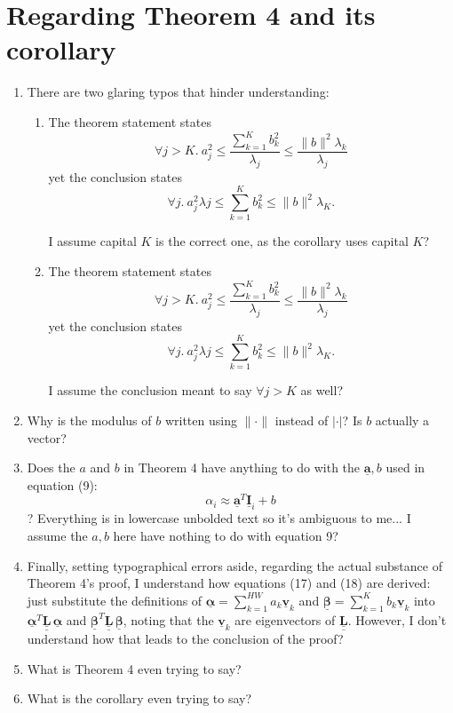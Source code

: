 \documentclass{article}
\def\vec#1{\underline{\mathbf{#1}}}
\def\vecbs#1{\underline{\boldsymbol{#1}}}
\def\mat#1{\underline{\underline{\mathbf{#1}}}}
\begin{document}
\section{Regarding Theorem 4 and its corollary}
\begin{enumerate}
    \item There are two glaring typos that hinder understanding:
    \begin{enumerate}
        \item The theorem statement states
        $$\forall j>K.\ a_j^2 \leq \frac{\sum_{k=1}^K b_k^2}{\lambda_j} \leq \frac{\|b\|^2 \lambda_{\boxed{k}}}{\lambda_j}$$
        yet the conclusion states
        $$\forall j.\ a_j^2\lambda j \leq \sum_{k=1}^K b_k^2 \leq \|b\|^2 \lambda_{\boxed{K}}.$$

        I assume capital $K$ is the correct one, as the corollary uses capital $K$?
        \item The theorem statement states
        $$\forall j\boxed{>K}.\ a_j^2 \leq \frac{\sum_{k=1}^K b_k^2}{\lambda_j} \leq \frac{\|b\|^2 \lambda_{k}}{\lambda_j}$$
        yet the conclusion states
        $$\forall j.\ a_j^2\lambda j \leq \sum_{k=1}^K b_k^2 \leq \|b\|^2 \lambda_{K}.$$

        I assume the conclusion meant to say $\forall j>K$ as well?
    \end{enumerate}
    \item Why is the modulus of $b$ written using $\|\cdot\|$ instead of $|\cdot|$? Is $b$ actually a vector?
    \item Does the $a$ and $b$ in Theorem 4 have anything to do with the $\vec{a},b$ used in equation (9):
    $$\alpha_i \approx \vec{a}^T\vec{I}_i + b$$
    ? Everything is in lowercase unbolded text so it's ambiguous to me... I assume the $a,b$ here have nothing to do with equation 9?
    \item Finally, setting typographical errors aside, regarding the actual substance of Theorem 4's proof, I understand how equations (17) and (18) are derived: just substitute the definitions of $\vecbs\alpha=\sum_{k=1}^{HW}a_k\vec{v}_k$ and $\vecbs\beta=\sum_{k=1}^K b_k\vec{v}_k$ into $\vecbs\alpha^T \mat{L}\,\vecbs\alpha$ and $\vecbs\beta^T \mat{L}\,\vecbs\beta$, noting that the $\vec{v}_k$ are eigenvectors of $\mat{L}$. However, I don't understand how that leads to the conclusion of the proof?
    \item What is Theorem 4 even trying to say?
    \item What is the corollary even trying to say?
\end{enumerate}
\end{document}
